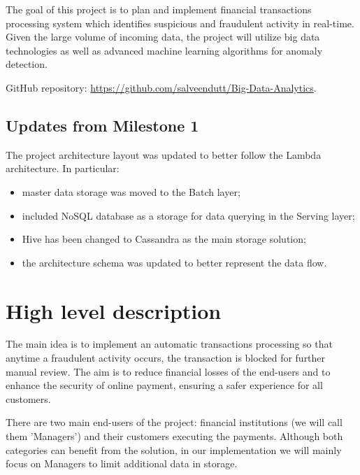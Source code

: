 \documentclass[12pt,a4paper, hidelinks]{article}
\begin{document}
The goal of this project is to plan and implement financial transactions processing system which identifies suspicious and fraudulent activity in real-time. Given the large volume of incoming data, the project will utilize big data technologies as well as advanced machine learning algorithms for anomaly detection.

GitHub repository: \href{https://github.com/salveendutt/Big-Data-Analytics}{https://github.com/salveendutt/Big-Data-Analytics}.

\subsection*{Updates from Milestone 1}
The project architecture layout was updated to better follow the Lambda architecture. In particular: 
\begin{itemize}
    \item master data storage was moved to the Batch layer;
    \item included NoSQL database as a storage for data querying in the Serving layer;
    \item Hive has been changed to Cassandra as the main storage solution;
    \item the architecture schema was updated to better represent the data flow. 
\end{itemize}


\section{High level description}

The main idea is to implement an automatic transactions processing so that anytime a fraudulent activity occurs, the transaction is blocked for further manual review. The aim is to reduce financial losses of the end-users and to enhance the security of online payment, ensuring a safer experience for all customers.

There are two main end-users of the project: financial institutions (we will call them 'Managers') and their customers executing the payments. Although both categories can benefit from the solution, in our implementation we will mainly focus on Managers to limit additional data in storage.
\end{document}

